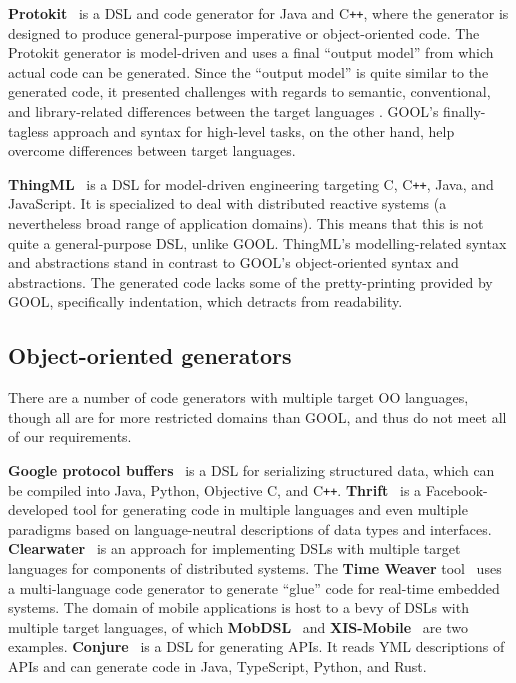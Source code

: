 \documentclass[sigplan,review,prologue,dvipsnames]{acmart}
\newcommand{\Cplusplus}{C\texttt{++}}
\begin{document}
\textbf{Protokit}~\cite{kovesdan2017multi} is a DSL and code generator for Java and
\Cplusplus, where the generator is designed to produce
general-purpose imperative or object-oriented code. The Protokit generator is
model-driven and uses a final ``output model'' from which actual code can be
generated. Since the ``output model'' is quite similar to the generated
code, it presented challenges with regards to semantic, conventional, and
library-related differences between the target languages
\cite{kovesdan2017multi}. GOOL's finally-tagless approach and syntax for
high-level tasks, on the other hand, help overcome differences between
target languages.

\textbf{ThingML}~\cite{harrand2016thingml} is a DSL for model-driven engineering
targeting C, \Cplusplus, Java, and JavaScript. It is specialized to deal with
distributed reactive systems (a nevertheless broad range of application domains).
This means that this is not quite a general-purpose DSL, unlike GOOL.
ThingML's modelling-related syntax and abstractions stand in contrast to GOOL's
object-oriented syntax and abstractions. The generated code lacks some of the
pretty-printing provided by GOOL, specifically indentation, which detracts from
readability.

\subsection{Object-oriented generators}

There are a number of code generators with multiple target OO languages,
though all are for more restricted domains than GOOL, and thus do not meet all
of our requirements.

\textbf{Google protocol buffers}~\cite{Protobuf} is a DSL for serializing
structured data, which can be compiled into Java, Python, Objective C, and
\Cplusplus.  \textbf{Thrift}~\cite{slee2007thrift} is a Facebook-developed tool
for generating code in multiple languages and even multiple paradigms based on
language-neutral descriptions of data types and interfaces.
\textbf{Clearwater}~\cite{swint2005clearwater} is an approach for implementing
DSLs with multiple target languages for components of distributed systems.  The
\textbf{Time Weaver} tool~\cite{de2004glue} uses a multi-language code
generator to generate ``glue'' code for real-time embedded systems.  The domain
of mobile applications is host to a bevy of DSLs with multiple target
languages, of which \textbf{MobDSL}~\cite{kramer2010mobdsl} and
\textbf{XIS-Mobile}~\cite{ribeiro2014xis} are two examples.
\textbf{Conjure}~\cite{Conjure} is a DSL for generating APIs. It reads YML
descriptions of APIs and can generate code in Java, TypeScript, Python, and
Rust.
\end{document}
